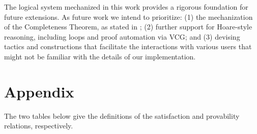 \documentclass{easychair}
\theoremstyle{remark}
\newcommand{\todo}[1]{\textcolor{red}{#1}}
\begin{document}




The logical system mechanized in this work provides a rigorous foundation for future extensions. As future work we intend to prioritize: (1) the mechanization of the Completeness Theorem, as stated in \cite{tableaux}; (2) further support for Hoare-style reasoning, including loops and proof automation via VCG; and (3) devising tactics and constructions that facilitate the interactions with various users that might not be familiar with the details of our implementation.



\newpage

\section*{Appendix}

\appendix

The two tables below give the definitions of the satisfaction and provability relations, respectively.
\end{document}
